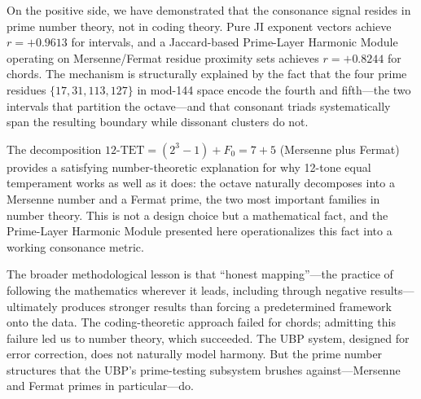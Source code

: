 \documentclass[11pt,a4paper]{article}
\theoremstyle{definition}
\begin{document}
On the positive side, we have demonstrated that the consonance signal resides in prime number theory, not in coding theory. Pure JI exponent vectors achieve $r = +0.9613$ for intervals, and a Jaccard-based Prime-Layer Harmonic Module operating on Mersenne/Fermat residue proximity sets achieves $r = +0.8244$ for chords. The mechanism is structurally explained by the fact that the four prime residues $\{17, 31, 113, 127\}$ in mod-144 space encode the fourth and fifth---the two intervals that partition the octave---and that consonant triads systematically span the resulting boundary while dissonant clusters do not.

The decomposition $12\text{-TET} = (2^3 - 1) + F_0 = 7 + 5$ (Mersenne plus Fermat) provides a satisfying number-theoretic explanation for why 12-tone equal temperament works as well as it does: the octave naturally decomposes into a Mersenne number and a Fermat prime, the two most important families in number theory. This is not a design choice but a mathematical fact, and the Prime-Layer Harmonic Module presented here operationalizes this fact into a working consonance metric.

The broader methodological lesson is that ``honest mapping''---the practice of following the mathematics wherever it leads, including through negative results---ultimately produces stronger results than forcing a predetermined framework onto the data. The coding-theoretic approach failed for chords; admitting this failure led us to number theory, which succeeded. The UBP system, designed for error correction, does not naturally model harmony. But the prime number structures that the UBP's prime-testing subsystem brushes against---Mersenne and Fermat primes in particular---do.

\end{document}
